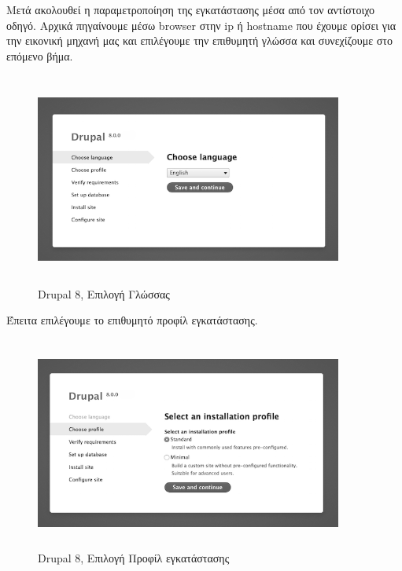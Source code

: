\documentclass[12pt]{report}
\begin{document}
Μετά ακολουθεί η παραμετροποίηση της εγκατάστασης μέσα από τον αντίστοιχο οδηγό. Αρχικά πηγαίνουμε μέσω \textlatin{browser} στην \textlatin{ip} ή \textlatin{hostname} που έχουμε ορίσει για την εικονική μηχανή μας και επιλέγουμε την επιθυμητή γλώσσα και συνεχίζουμε στο επόμενο βήμα.
\begin{figure}[H]
\centering
\includegraphics[width=0.9\textwidth, height=7cm]{drupal-choose-language-gray}
\caption{\textlatin{Drupal 8}, Επιλογή Γλώσσας}
\label{fig:drupal_lang}
\end{figure}

Έπειτα επιλέγουμε το επιθυμητό προφίλ εγκατάστασης.
\begin{figure}[H]
\centering
\includegraphics[width=0.9\textwidth, height=7cm]{drupal-choose-installation-profile-gray}
\caption{\textlatin{Drupal 8}, Επιλογή Προφίλ εγκατάστασης}
\label{fig:drupal_profile}
\end{figure}
\end{document}
